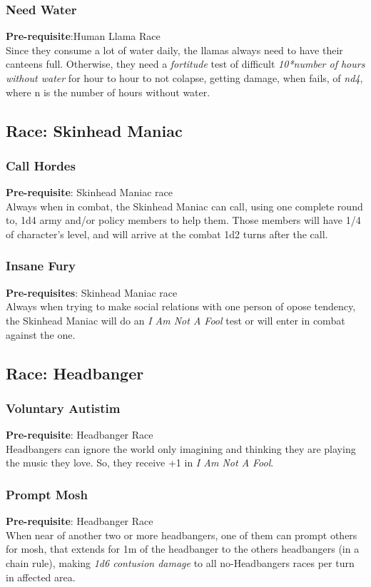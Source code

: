 \documentclass[ letterpaper,12pt]{article}
\begin{document}
\subsubsection{Need Water}
{\bf Pre-requisite}:Human Llama Race\\
Since they consume a lot of water daily, the llamas always need to have their canteens full. Otherwise, they need a {\it fortitude} test of difficult {\it 10*number of hours without water} for hour to hour to not colapse, getting damage, when fails, of {\it nd4}, where n is the number of hours without water.

\subsection{Race: Skinhead Maniac}

\subsubsection{Call Hordes}
 {\bf Pre-requisite}: Skinhead Maniac race\\
 Always when in combat, the Skinhead Maniac can call, using one complete round to, 1d4 army and/or policy members to help them. Those members will have 1/4 of character's level, and will arrive at the combat 1d2 turns after the call.

\subsubsection{Insane Fury}
 {\bf Pre-requisites}: Skinhead Maniac race\\
 Always when trying to make social relations with one person of opose tendency, the Skinhead Maniac will do an {\it I Am Not A Fool} test or will enter in combat against the one.

\subsection{Race: Headbanger}

\subsubsection{Voluntary Autistim}
{\bf Pre-requisite}: Headbanger Race\\
Headbangers can ignore the world only imagining and thinking they are playing the music they love. So, they receive +1 in {\it I Am Not A Fool}.\\

\subsubsection{Prompt Mosh}
 {\bf Pre-requisite}: Headbanger Race\\
 When near of another two or more headbangers, one of them can prompt others for mosh, that extends for 1m of the headbanger to the others headbangers (in a chain rule), making {\it 1d6 contusion damage} to all no-Headbangers races per turn in affected area.
\end{document}
